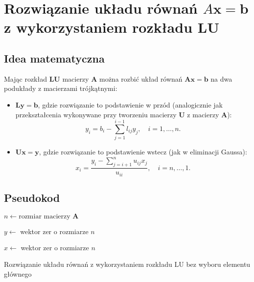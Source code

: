 \documentclass{article}
\begin{document}
\section{Rozwiązanie układu równań $A \mathbf{x} = \mathbf{b}$ z wykorzystaniem rozkładu LU}
\subsection{Idea matematyczna}
Mając rozkład $\mathbf{LU}$ macierzy $\mathbf{A}$ można rozbić układ równań $\mathbf{Ax=b}$ na dwa podukłady z macierzami trójkątnymi:
\begin{itemize}
    \item $ \mathbf{Ly} = \mathbf{b}$, gdzie rozwiązanie to podstawienie w przód (analogicznie jak przekształcenia wykonywane przy tworzeniu macierzy $\mathbf{U}$ z macierzy $\mathbf{A}$):
    \[
    y_i = b_i - \sum_{j=1}^{i-1} l_{ij} y_j, \quad i = 1, \dots, n.
    \]
    \item $ \mathbf{Ux} = \mathbf{y}$, gdzie rozwiązanie to podstawienie wstecz (jak w eliminacji Gaussa):
    \[
    x_i = \frac{y_i - \sum_{j=i+1}^n u_{ij} x_j}{u_{ii}}, \quad i = n, \dots, 1.
    \]
\end{itemize}
\subsection{Pseudokod}
\begin{algorithm}[H]
\SetAlgoLined
\setcounter{AlgoLine}{0} %

$n \gets \text{rozmiar macierzy } \mathbf{A}$\;

$y \gets$ wektor zer o rozmiarze $n$\;

$x \gets$ wektor zer o rozmiarze $n$\;



\;
\caption{Rozwiązanie układu równań  z wykorzystaniem rozkładu LU bez wyboru elementu głównego}
\end{algorithm}
\end{document}
